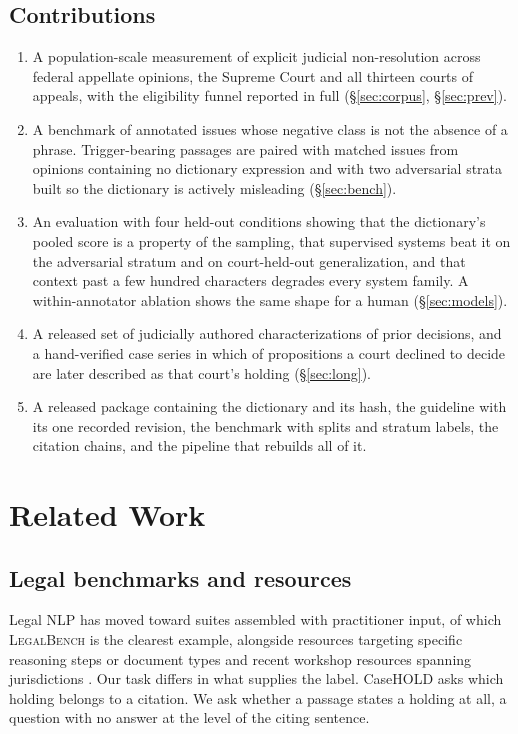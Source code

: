 \documentclass[11pt]{article}
\begin{document}
\subsection{Contributions}
\begin{enumerate}\setlength{\itemsep}{1pt}
\item A population-scale measurement of explicit judicial non-resolution across
\NFedApp{} federal appellate opinions, the Supreme Court and all thirteen courts
of appeals, with the eligibility funnel reported in full (\S\ref{sec:corpus},
\S\ref{sec:prev}).
\item A benchmark of \NBench{} annotated issues whose negative class is not the
absence of a phrase. Trigger-bearing passages are paired with matched issues from
opinions containing no dictionary expression and with two adversarial strata
built so the dictionary is actively misleading (\S\ref{sec:bench}).
\item An evaluation with four held-out conditions showing that the dictionary's
pooled score is a property of the sampling, that supervised systems beat it on
the adversarial stratum and on court-held-out generalization, and that context
past a few hundred characters degrades every system family. A within-annotator
ablation shows the same shape for a human (\S\ref{sec:models}).
\item A released set of \NCharTight{} judicially authored characterizations of
prior decisions, and a hand-verified case series in which \NIMEsc{} of
\NIMDistinct{} propositions a court declined to decide are later described as
that court's holding (\S\ref{sec:long}).
\item A released package containing the dictionary and its hash, the guideline
with its one recorded revision, the benchmark with splits and stratum labels, the
citation chains, and the pipeline that rebuilds all of it.
\end{enumerate}

\section{Related Work}

\subsection{Legal benchmarks and resources} Legal NLP has moved toward suites
assembled with practitioner input, of which \textsc{LegalBench}
\citep{guha2023legalbench} is the clearest example, alongside resources targeting
specific reasoning steps or document types \citep{zheng2021casehold,
chalkidis2022lexglue, hendrycks2021cuad} and recent workshop resources spanning
jurisdictions \citep{xie2024clcuket, jang2025pilot}. Our task differs in what
supplies the label. CaseHOLD asks which holding belongs to a citation. We ask
whether a passage states a holding at all, a question with no answer at the level
of the citing sentence.
\end{document}
